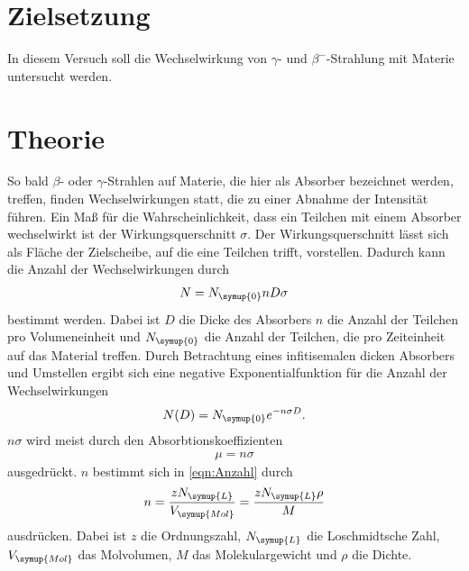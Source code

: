 \section{Zielsetzung}
\label{sec:Zielsetzung}
In diesem Versuch soll die Wechselwirkung von $\gamma$- und $\beta^{-}$-Strahlung mit Materie untersucht werden.

\section{Theorie}
\label{sec:Theorie}
So bald $\beta$- oder $\gamma$-Strahlen auf Materie, die hier als Absorber bezeichnet werden, treffen, finden
Wechselwirkungen statt, die zu einer Abnahme der Intensität führen. Ein Maß für die Wahrscheinlichkeit, dass
ein Teilchen mit einem Absorber wechselwirkt ist der Wirkungsquerschnitt $\sigma$. Der Wirkungsquerschnitt lässt
sich als Fläche der Zielscheibe, auf die eine Teilchen trifft, vorstellen. Dadurch kann die Anzahl der
Wechselwirkungen durch
\begin{align*}
    N = N_{\symup{0}} n D \sigma
\end{align*}
bestimmt werden. Dabei ist $D$ die Dicke des Absorbers $n$ die Anzahl der Teilchen pro Volumeneinheit und
$N_{\symup{0}}$ die Anzahl der Teilchen, die pro Zeiteinheit auf das Material treffen. Durch Betrachtung eines
infitisemalen dicken Absorbers und Umstellen ergibt sich eine negative Exponentialfunktion für die Anzahl der
Wechselwirkungen
\begin{align}
    \label{eqn:Anzahl}
    N(D) = N_{\symup{0}} e^{-n \sigma D}.
\end{align}
$n \sigma$ wird meist durch den Absorbtionskoeffizienten
\begin{align}
    \label{eqn:Absorbtionskoeffizient}
    \mu = n\sigma
\end{align}
ausgedrückt. $n$ bestimmt sich in \autoref{eqn:Anzahl} durch
\begin{align*}
    n = \frac{zN_{\symup{L}}}{V_{\symup{Mol}}} = \frac{zN_{\symup{L}}\rho}{M}
\end{align*}
ausdrücken. Dabei ist $z$ die Ordnungszahl, $N_{\symup{L}}$ die Loschmidtsche Zahl, $V_{\symup{Mol}}$ das
Molvolumen, $M$ das Molekulargewicht und $\rho$ die Dichte.

